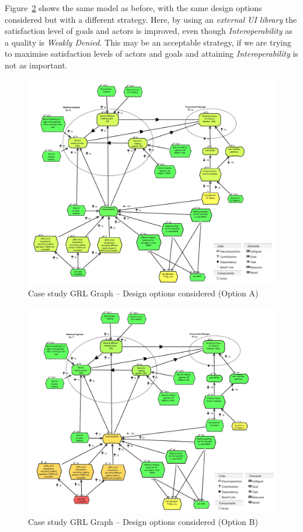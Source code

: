 \documentclass[dissertation,final]{softeng}
\begin{document}
Figure~\ref{fig:casestudy-designoptionsB} shows the same model as before, with the same design options considered but with a different strategy. Here, by using an \emph{external UI library} the satisfaction level of goals and actors is improved, even though \emph{Interoperability} as a quality is \emph{Weakly Denied}. This may be an acceptable strategy, if we are trying to maximise satisfaction levels of actors and goals and attaining \emph{Interoperability} is not as important.

\begin{figure}
\includegraphics[width=\columnwidth]{casestudy-designoptionsA}
\centering
\caption{Case study GRL Graph -- Design options considered (Option A)}
\label{fig:casestudy-designoptionsA}
\end{figure}

\begin{figure}
\includegraphics[width=\columnwidth]{casestudy-designoptionsB}
\centering
\caption{Case study GRL Graph -- Design options considered (Option B)}
\label{fig:casestudy-designoptionsB}
\end{figure}
\end{document}
